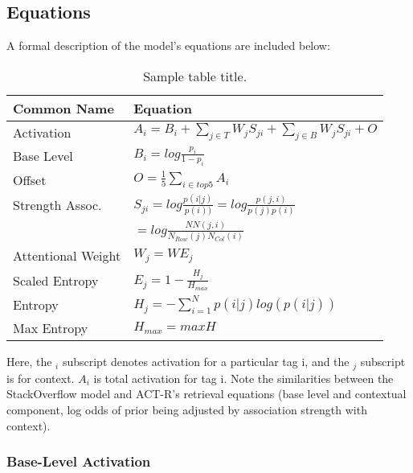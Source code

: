 \documentclass[10pt,letterpaper]{article}
\begin{document}
\subsection{Equations}

A formal description of the model's equations are included below:

\begin{table}[!ht]
  \begin{center} 
    \caption{Sample table title.} 
    \label{sample-table} 
    \vskip 0.12in
    \begin{tabular}{ll} 
      \hline
      Common Name &  Equation \\
      \hline
      Activation & 		$A_{i} = B_{i} + \sum_{j\in T}^{ } W_{j} S_{ji} + \sum_{j\in B}^{ } W_{j} S_{ji} + O$ \\
      Base Level & 		$B_{i} = log \frac{p_{i}}{1-p_{i}}$ \\
      Offset & 			$O = \frac{1}{5}\sum_{i\in top 5}^{ } A_{i}$ \\
      Strength Assoc. &		$S_{ji} = log \frac{p(i|j)}{p(i))} = log \frac{p(j,i)}{p(j)p(i)}$ \\
      & 			$= log \frac{NN(j,i)}{N_{Row}(j)N_{Col}(i)}$ \\
      Attentional Weight	& $W_{j} = WE_{j}$ \\
      Scaled Entropy & 		$E_{j} = 1-\frac{H_{j}}{H_{max}}$ \\
      Entropy & 		$H_{j} = -\sum_{i=1}^{N}p(i|j)log\left (  p(i|j) \right )$ \\
      Max Entropy & 		$H_{max} = maxH$ \\
      \hline
    \end{tabular} 
  \end{center} 
\end{table}

Here, the $_{i}$ subscript denotes activation for a particular tag i, and the $_{j}$ subscript is for context.
$A_{i}$ is total activation for tag i.
Note the similarities between the StackOverflow model and ACT-R's retrieval equations (base level and contextual component, log odds of prior being adjusted by association strength with context).

\subsubsection{Base-Level Activation}
\end{document}
